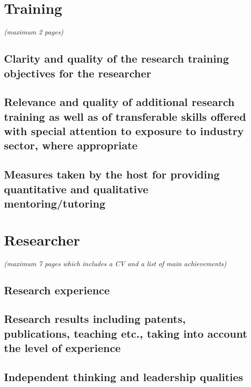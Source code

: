 \documentclass[a4paper,11pt]{article}
\newenvironment{xcomment}{\em}{}
\begin{document}
\section{Training}
\begin{xcomment}
 (maximum 2 pages)
\end{xcomment}
\subsection{Clarity and quality of the research training objectives for the researcher}
\subsection{Relevance and quality of additional research training as well as of transferable skills offered with special attention to exposure to industry sector, where appropriate}
\subsection{Measures taken by the host for providing quantitative and qualitative mentoring/tutoring}


\section{Researcher}
\begin{xcomment}  
(maximum 7 pages which includes a CV and a list of main achievements)
\end{xcomment}

\subsection{Research experience}
\subsection{Research results including patents, publications, teaching etc., taking into account the level of experience}
\subsection{Independent thinking and leadership qualities}
\end{document}
